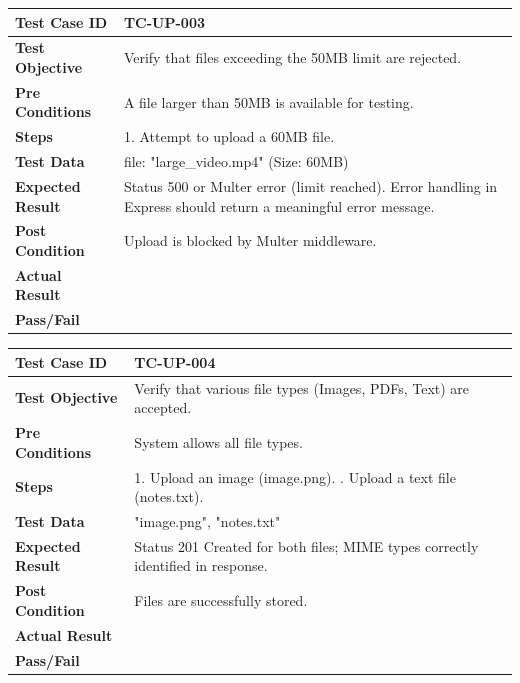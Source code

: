 \begin{longtable}{|p{}|p{}|}
\hline
\textbf{Test Case ID} & TC-UP-003 \\ \hline
\textbf{Test Objective} & Verify that files exceeding the 50MB limit are rejected. \\ \hline
\textbf{Pre Conditions} & A file larger than 50MB is available for testing. \\ \hline
\textbf{Steps} & 
1. Attempt to upload a 60MB file. \\ \hline
\textbf{Test Data} & file: "large\_video.mp4" (Size: 60MB) \\ \hline
\textbf{Expected Result} & Status 500 or Multer error (limit reached). Error handling in Express should return a meaningful error message. \\ \hline
\textbf{Post Condition} & Upload is blocked by Multer middleware. \\ \hline
\textbf{Actual Result} &  \\ \hline
\textbf{Pass/Fail} &  \\ \hline
\end{longtable}

\begin{longtable}{|p{}|p{}|}
\hline
\textbf{Test Case ID} & TC-UP-004 \\ \hline
\textbf{Test Objective} & Verify that various file types (Images, PDFs, Text) are accepted. \\ \hline
\textbf{Pre Conditions} & System allows all file types. \\ \hline
\textbf{Steps} & 
1. Upload an image (image.png). \newline
2. Upload a text file (notes.txt). \\ \hline
\textbf{Test Data} & "image.png", "notes.txt" \\ \hline
\textbf{Expected Result} & Status 201 Created for both files; MIME types correctly identified in response. \\ \hline
\textbf{Post Condition} & Files are successfully stored. \\ \hline
\textbf{Actual Result} &  \\ \hline
\textbf{Pass/Fail} &  \\ \hline
\end{longtable}

